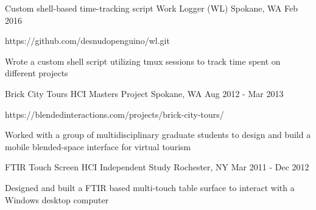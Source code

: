 

\begin{cventries}

  \cventry
    {Custom shell-based time-tracking script} %
    {Work Logger (WL)} %
    {Spokane, WA} %
    {Feb 2016} %
    {
      \begin{cvitems} %
        \item {https://github.com/desnudopenguino/wl.git}
        \item {Wrote a custom shell script utilizing tmux sessions to track time spent on different projects}
      \end{cvitems}
    }

  \cventry
    {Brick City Tours} %
    {HCI Masters Project} %
    {Spokane, WA} %
    {Aug 2012 - Mar 2013} %
    {
      \begin{cvitems} %
        \item {https://blendedinteractions.com/projects/brick-city-tours/}
        \item {Worked with a group of multidisciplinary graduate students to design and build a mobile blended-space interface for virtual tourism}
      \end{cvitems}
    }

  \cventry
    {FTIR Touch Screen} %
    {HCI Independent Study} %
    {Rochester, NY} %
    {Mar 2011 - Dec 2012} %
    {
      \begin{cvitems} %
        \item {Designed and built a FTIR based multi-touch table surface to interact with a Windows desktop computer}
      \end{cvitems}
    }

\end{cventries}
